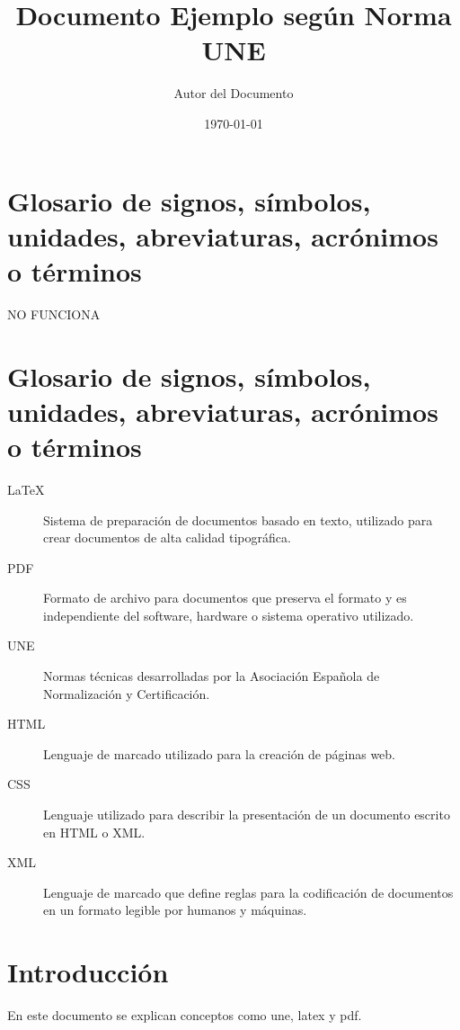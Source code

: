 \documentclass[a4paper,12pt]{article}
\begin{document}
\title{Documento Ejemplo según Norma UNE}
\author{Autor del Documento}
\date{\today}
\maketitle

\tableofcontents

\section*{Glosario de signos, símbolos, unidades, abreviaturas, acrónimos o términos}
\glsaddall %
\printglossary %

NO FUNCIONA

\section*{Glosario de signos, símbolos, unidades, abreviaturas, acrónimos o términos}

\begin{description}
  \item[LaTeX] Sistema de preparación de documentos basado en texto, utilizado para crear documentos de alta calidad tipográfica.
  \item[PDF] Formato de archivo para documentos que preserva el formato y es independiente del software, hardware o sistema operativo utilizado.
  \item[UNE] Normas técnicas desarrolladas por la Asociación Española de Normalización y Certificación.
  \item[HTML] Lenguaje de marcado utilizado para la creación de páginas web.
  \item[CSS] Lenguaje utilizado para describir la presentación de un documento escrito en HTML o XML.
  \item[XML] Lenguaje de marcado que define reglas para la codificación de documentos en un formato legible por humanos y máquinas.
\end{description}
\section{Introducción}
En este documento se explican conceptos como \gls{une}, \gls{latex} y \gls{pdf}.
\end{document}
